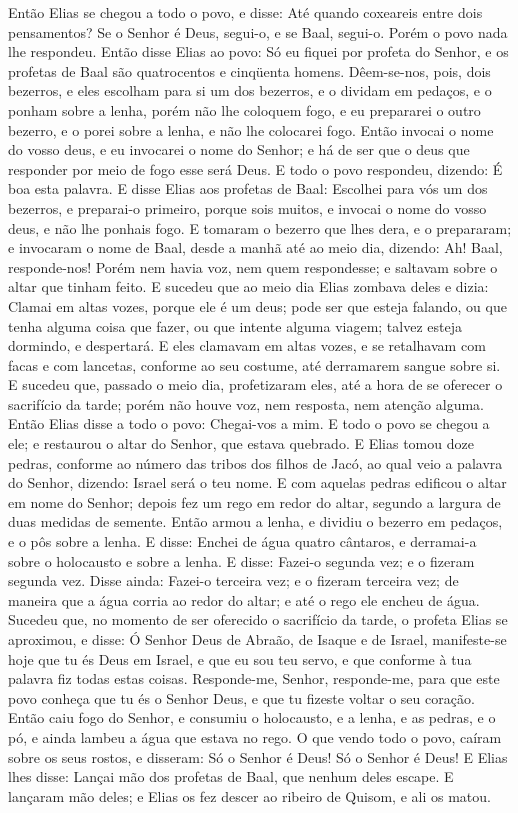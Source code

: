 Então Elias se chegou a todo o povo, e disse: Até quando
coxeareis entre dois pensamentos? Se o Senhor é Deus, segui-o, e se
Baal, segui-o. Porém o povo nada lhe respondeu. Então disse
Elias ao povo: Só eu fiquei por profeta do Senhor, e os profetas de
Baal são quatrocentos e cinqüenta homens. Dêem-se-nos, pois,
dois bezerros, e eles escolham para si um dos bezerros, e o dividam
em pedaços, e o ponham sobre a lenha, porém não lhe coloquem fogo, e
eu prepararei o outro bezerro, e o porei sobre a lenha, e não lhe
colocarei fogo. Então invocai o nome do vosso deus, e eu
invocarei o nome do Senhor; e há de ser que o deus que responder por
meio de fogo esse será Deus. E todo o povo respondeu, dizendo: É boa
esta palavra. E disse Elias aos profetas de Baal: Escolhei
para vós um dos bezerros, e preparai-o primeiro, porque sois muitos,
e invocai o nome do vosso deus, e não lhe ponhais fogo. E
tomaram o bezerro que lhes dera, e o prepararam; e invocaram o nome
de Baal, desde a manhã até ao meio dia, dizendo: Ah! Baal,
responde-nos! Porém nem havia voz, nem quem respondesse; e saltavam
sobre o altar que tinham feito. E sucedeu que ao meio dia
Elias zombava deles e dizia: Clamai em altas vozes, porque ele é um
deus; pode ser que esteja falando, ou que tenha alguma coisa que
fazer, ou que intente alguma viagem; talvez esteja dormindo, e
despertará. E eles clamavam em altas vozes, e se retalhavam
com facas e com lancetas, conforme ao seu costume, até derramarem
sangue sobre si. E sucedeu que, passado o meio dia,
profetizaram eles, até a hora de se oferecer o sacrifício da tarde;
porém não houve voz, nem resposta, nem atenção alguma. Então
Elias disse a todo o povo: Chegai-vos a mim. E todo o povo se chegou
a ele; e restaurou o altar do Senhor, que estava quebrado. E
Elias tomou doze pedras, conforme ao número das tribos dos filhos de
Jacó, ao qual veio a palavra do Senhor, dizendo: Israel será o teu
nome. E com aquelas pedras edificou o altar em nome do
Senhor; depois fez um rego em redor do altar, segundo a largura de
duas medidas de semente. Então armou a lenha, e dividiu o
bezerro em pedaços, e o pôs sobre a lenha. E disse: Enchei de
água quatro cântaros, e derramai-a sobre o holocausto e sobre a
lenha. E disse: Fazei-o segunda vez; e o fizeram segunda vez. Disse
ainda: Fazei-o terceira vez; e o fizeram terceira vez; de
maneira que a água corria ao redor do altar; e até o rego ele encheu
de água. Sucedeu que, no momento de ser oferecido o
sacrifício da tarde, o profeta Elias se aproximou, e disse: Ó Senhor
Deus de Abraão, de Isaque e de Israel, manifeste-se hoje que tu és
Deus em Israel, e que eu sou teu servo, e que conforme à tua palavra
fiz todas estas coisas. Responde-me, Senhor, responde-me,
para que este povo conheça que tu és o Senhor Deus, e que tu fizeste
voltar o seu coração. Então caiu fogo do Senhor, e consumiu o
holocausto, e a lenha, e as pedras, e o pó, e ainda lambeu a água
que estava no rego. O que vendo todo o povo, caíram sobre os
seus rostos, e disseram: Só o Senhor é Deus! Só o Senhor é Deus!
E Elias lhes disse: Lançai mão dos profetas de Baal, que
nenhum deles escape. E lançaram mão deles; e Elias os fez descer ao
ribeiro de Quisom, e ali os matou.

